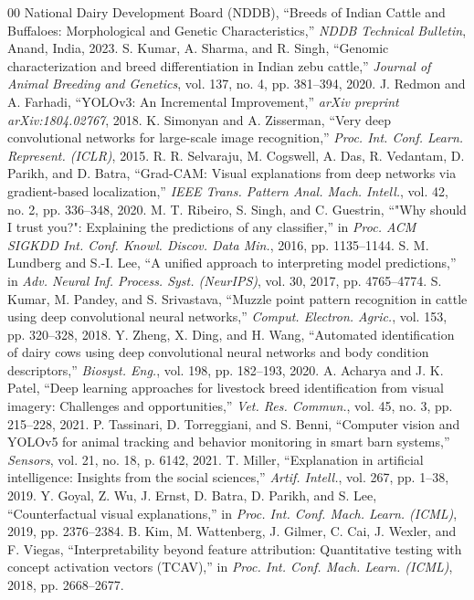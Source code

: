 \documentclass[conference]{IEEEtran}
\begin{document}

\begin{thebibliography}{00}
 National Dairy Development Board (NDDB), ``Breeds of Indian Cattle and Buffaloes: Morphological and Genetic Characteristics,'' \textit{NDDB Technical Bulletin}, Anand, India, 2023.
 S. Kumar, A. Sharma, and R. Singh, ``Genomic characterization and breed differentiation in Indian zebu cattle,'' \textit{Journal of Animal Breeding and Genetics}, vol. 137, no. 4, pp. 381--394, 2020.
 J. Redmon and A. Farhadi, ``YOLOv3: An Incremental Improvement,'' \textit{arXiv preprint arXiv:1804.02767}, 2018.
 K. Simonyan and A. Zisserman, ``Very deep convolutional networks for large-scale image recognition,'' \textit{Proc. Int. Conf. Learn. Represent. (ICLR)}, 2015.
 R. R. Selvaraju, M. Cogswell, A. Das, R. Vedantam, D. Parikh, and D. Batra, ``Grad-CAM: Visual explanations from deep networks via gradient-based localization,'' \textit{IEEE Trans. Pattern Anal. Mach. Intell.}, vol. 42, no. 2, pp. 336--348, 2020.
 M. T. Ribeiro, S. Singh, and C. Guestrin, ``"Why should I trust you?": Explaining the predictions of any classifier,'' in \textit{Proc. ACM SIGKDD Int. Conf. Knowl. Discov. Data Min.}, 2016, pp. 1135--1144.
 S. M. Lundberg and S.-I. Lee, ``A unified approach to interpreting model predictions,'' in \textit{Adv. Neural Inf. Process. Syst. (NeurIPS)}, vol. 30, 2017, pp. 4765--4774.
 S. Kumar, M. Pandey, and S. Srivastava, ``Muzzle point pattern recognition in cattle using deep convolutional neural networks,'' \textit{Comput. Electron. Agric.}, vol. 153, pp. 320--328, 2018.
 Y. Zheng, X. Ding, and H. Wang, ``Automated identification of dairy cows using deep convolutional neural networks and body condition descriptors,'' \textit{Biosyst. Eng.}, vol. 198, pp. 182--193, 2020.
 A. Acharya and J. K. Patel, ``Deep learning approaches for livestock breed identification from visual imagery: Challenges and opportunities,'' \textit{Vet. Res. Commun.}, vol. 45, no. 3, pp. 215--228, 2021.
 P. Tassinari, D. Torreggiani, and S. Benni, ``Computer vision and YOLOv5 for animal tracking and behavior monitoring in smart barn systems,'' \textit{Sensors}, vol. 21, no. 18, p. 6142, 2021.
 T. Miller, ``Explanation in artificial intelligence: Insights from the social sciences,'' \textit{Artif. Intell.}, vol. 267, pp. 1--38, 2019.
 Y. Goyal, Z. Wu, J. Ernst, D. Batra, D. Parikh, and S. Lee, ``Counterfactual visual explanations,'' in \textit{Proc. Int. Conf. Mach. Learn. (ICML)}, 2019, pp. 2376--2384.
 B. Kim, M. Wattenberg, J. Gilmer, C. Cai, J. Wexler, and F. Viegas, ``Interpretability beyond feature attribution: Quantitative testing with concept activation vectors (TCAV),'' in \textit{Proc. Int. Conf. Mach. Learn. (ICML)}, 2018, pp. 2668--2677.
\end{thebibliography}
\end{document}
